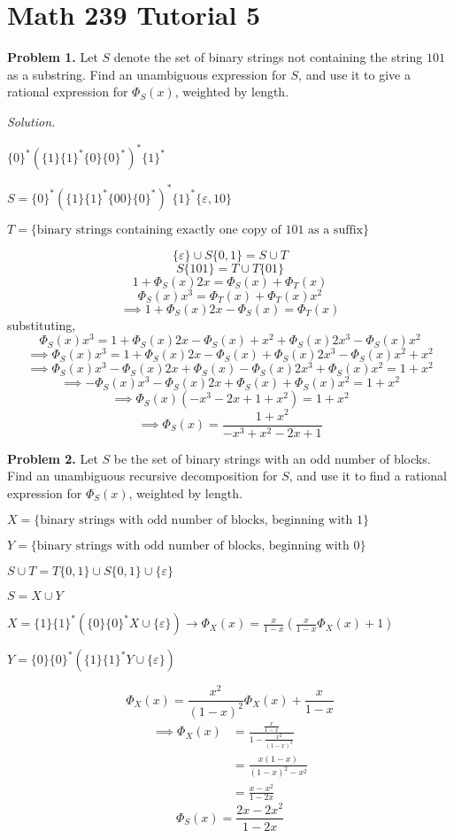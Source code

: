 \section{Math 239 Tutorial 5}

\textbf{Problem 1.}
Let $ S $ denote the set of binary strings not containing the string $ 101 $
as a substring. Find an unambiguous expression for $ S $, and use it to give a
rational expression for $ \Phi_S(x) $, weighted by length.

\emph{Solution.}

$ \{0\}^* (\{1\}\{1\}^*\{0\}\{0\}^*)^*\{1\}^* $

$ S = \{0\}^*(\{1\}\{1\}^*\{00\}\{0\}^*)^*\{1\}^*\{\varepsilon, 10\} $

$ T=\{\text{binary strings containing exactly one copy of } 101\text{ as a suffix}\} $

\[ \{\varepsilon\}\cup S \{0,1\}=S \cup T \]
\[ S \{101\}=T\cup T \{01\} \]
\[ 1+\Phi_S(x)2x=\Phi_S(x)+\Phi_T(x) \]
\[ \Phi_S(x)x^3=\Phi_T(x)+\Phi_T(x)x^2 \]
\[ \implies 1+\Phi_S(x)2x-\Phi_S(x)=\Phi_T(x) \]
substituting,
\[ \Phi_S(x)x^3=1+\Phi_S(x)2x-\Phi_S(x)+x^2+\Phi_S(x)2x^3-\Phi_S(x)x^2 \]
\[ \implies\Phi_S(x)x^3=1+\Phi_S(x)2x-\Phi_S(x)+\Phi_S(x)2x^3-\Phi_S(x)x^2+x^2 \]
\[ \implies\Phi_S(x)x^3-\Phi_S(x)2x+\Phi_S(x)-\Phi_S(x)2x^3+\Phi_S(x)x^2=1+x^2 \]
\[ \implies-\Phi_S(x)x^3-\Phi_S(x)2x+\Phi_S(x)+\Phi_S(x)x^2=1+x^2 \]
\[ \implies\Phi_S(x)(-x^3-2x+1+x^2)=1+x^2 \]
\[ \implies\Phi_S(x)=\frac{1+x^2}{-x^3+x^2-2x+1} \]


\textbf{Problem 2.}
Let $ S $ be the set of binary strings with an odd number of blocks. Find
an unambiguous recursive decomposition for $ S $, and use it to find a rational
expression for $ \Phi_S(x) $, weighted by length.

$ X=\{\text{binary strings with odd number of blocks, beginning with }1\} $

$ Y=\{\text{binary strings with odd number of blocks, beginning with }0\} $

$ S\cup T = T \{0,1\}\cup S \{0,1\} \cup \{\varepsilon\} $

$ S=X\cup Y $

$ X=\{1\}\{1\}^*(\{0\}\{0\}^* X \cup \{\varepsilon\}) \rightarrow
\Phi_X(x)=\frac{x}{1-x}\left( \frac{x}{1-x} \Phi_X(x)+1 \right)$

$ Y=\{0\}\{0\}^*(\{1\}\{1\}^* Y\cup \{\varepsilon\}) $

\[ \Phi_X(x)=\frac{x^2}{(1-x)^2}\Phi_X(x)+\frac{x}{1-x} \]
\begin{align*}
    \implies\Phi_X(x)
    &=\frac{\frac{x}{1-x}}{1-\frac{x^2}{(1-x)^2}}\\
    &=\frac{x(1-x)}{(1-x)^2-x^2}\\
    &=\frac{x-x^2}{1-2x}
\end{align*}
\[ \Phi_S(x)=\frac{2x-2x^2}{1-2x} \]

